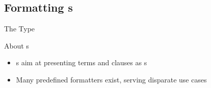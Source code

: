 \documentclass[handout]{beamer}
\begin{document}
\subsection{Formatting s}

\begin{frame}{The  Type}
    \begin{block}{About s}
        \begin{itemize}
            \item {}s aim at \alert{presenting} terms and clauses as s
            \item Many predefined formatters exist, serving disparate use cases
        \end{itemize}
    \end{block}

\end{frame}
\end{document}
